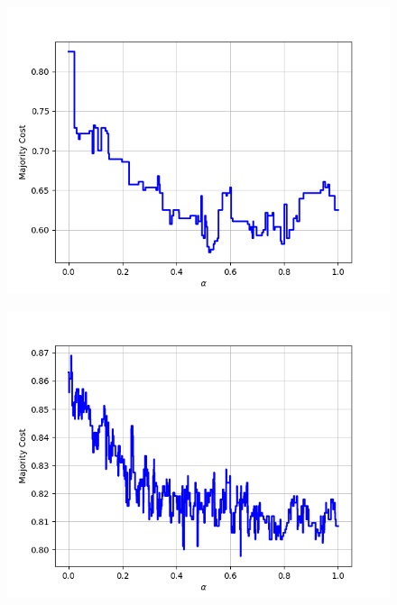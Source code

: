 \begin{figure}[H]
\begin{minipage}{.24\textwidth}
  {\includegraphics[width=\linewidth]{plots/omniglot-intra-ac/N_Ko}}
\end{minipage}
\begin{minipage}{.24\textwidth}
  \centering
  {\includegraphics[width=\linewidth]{plots/omniglot-intra-ac/Ojibwe_(Canadian_Aboriginal_Syllabics)}}
\end{minipage}
\begin{minipage}{.24\textwidth}
  \centering

\end{minipage}
\end{figure}
